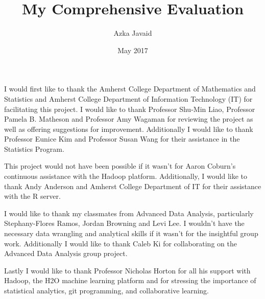 \documentclass[12pt,twoside]{amherstthesis}
\title{My Comprehensive Evaluation}
\author{Azka Javaid}
\date{May 2017}
\begin{document}
      \maketitle
  
  \frontmatter %
  \pagestyle{empty} %

      \begin{acknowledgements}
      \textbar{} I would first like to thank the Amherst College Department of
      Mathematics and Statistics and Amherst College Department of Information
      Technology (IT) for facilitating this project. I would like to thank
      Professor Shu-Min Liao, Professor Pamela B. Matheson and Professor Amy
      Wagaman for reviewing the project as well as offering suggestions for
      improvement. Additionally I would like to thank Professor Eunice Kim and
      Professor Susan Wang for their assistance in the Statistics Program.
      
      This project would not have been possible if it wasn't for Aaron
      Coburn's continuous assistance with the Hadoop platform. Additionally, I
      would like to thank Andy Anderson and Amherst College Department of IT
      for their assistance with the R server.
      
      I would like to thank my classmates from Advanced Data Analysis,
      particularly Stephany-Flores Ramos, Jordan Browning and Levi Lee. I
      wouldn't have the necessary data wrangling and analytical skills if it
      wasn't for the insightful group work. Additionally I would like to thank
      Caleb Ki for collaborating on the Advanced Data Analysis group project.
      
      Lastly I would like to thank Professor Nicholas Horton for all his
      support with Hadoop, the H2O machine learning platform and for stressing
      the importance of statistical analytics, git programming, and
      collaborative learning.
    \end{acknowledgements}
  
  

      \hypersetup{linkcolor=black}
    \setcounter{tocdepth}{2}
    \tableofcontents
  
      \listoftables
  
      \listoffigures
  
\end{document}
